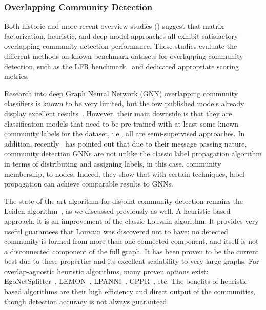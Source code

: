 \subsubsection{Overlapping Community Detection}
Both historic and more recent overview studies (\cite{xie_overlapping_2013, li_deeper_2018, liu_deep_2020, vieira_comparative_2020}) suggest that matrix factorization, heuristic, and deep model approaches all exhibit satisfactory overlapping community detection performance. These studies evaluate the different methods on known benchmark datasets for overlapping community detection, such as the LFR benchmark~\cite{lancichinetti_benchmarks_2009} and dedicated appropriate scoring metrics.

Research into deep Graph Neural Network (GNN) overlapping community classifiers is known to be very limited, but the few published models already display excellent results~\cite{jia_communitygan_2019, wang_unifying_2020}. However, their main downside is that they are classification models that need to be pre-trained with at least some known community labels for the dataset, i.e., all are semi-supervised approaches. In addition, recently~\cite{huang_combining_2020} has pointed out that due to their message passing nature, community detection GNNs are not unlike the classic label propagation algorithm in terms of distributing and assigning labels, in this case, community membership, to nodes. Indeed, they show that with certain techniques, label propagation can achieve comparable results to GNNs.

The state-of-the-art algorithm for disjoint community detection remains the Leiden algorithm~\cite{traag_louvain_2019}, as we discussed previously as well. A heuristic-based approach, it is an improvement of the classic Louvain algorithm. It provides very useful guarantees that Louvain was discovered not to have: no detected community is formed from more than one connected component, and itself is not a disconnected component of the full graph. It has been proven to be the current best due to these properties and its excellent scalability to very large graphs. For overlap-agnostic heuristic algorithms, many proven options exist: EgoNetSplitter~\cite{epasto_ego-splitting_2017}, LEMON~\cite{li_local_2018}, LPANNI~\cite{lu_lpanni_2019}, CPPR~\cite{gao_overlapping_2021}, etc. The benefits of heuristic-based algorithms are their high efficiency and direct output of the communities, though detection accuracy is not always guaranteed.

